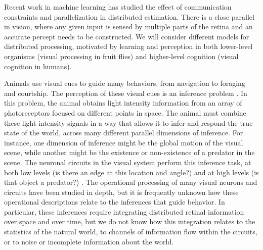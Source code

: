 
\label{sec:aim1}
\vskip-10pt


Recent work in machine learning has studied the effect of
communication constraints and parallelization in distributed
estimation. There is a close parallel in vision, where any given input
is sensed by multiple parts of the retina and an accurate percept
needs to be constructed. We will consider different models
for distributed processing, motivated by learning and perception in
both lower-level organisms (visual processing in fruit flies) and
higher-level cognition (visual cognition in humans). 


\biobackground{}
Animals use visual cues to guide many behaviors, from navigation to
foraging and courtship. The perception of these visual cues is an
inference problem \citep{knill:96}. In this problem, the
animal obtains light intensity information from an array of
photoreceptors focused on different points in space. The animal must
combine these light intensity signals in a way that allows it to infer
and respond the true state of the world, across many different
parallel dimensions of inference. For instance, one dimension of
inference might be the global motion of the visual scene, while
another might be the existence or non-existence of a predator in the
scene. The neuronal circuits in the visual system perform this
inference task, at both low levels (is there an edge at this location
and angle?) and at high levels (is that object a predator?)
\citep{simoncelli:01}. The operational processing of many
visual neurons and circuits have been studied in depth, but it is
frequently unknown how these operational descriptions relate to the
inferences that guide behavior. In particular, these inferences
require integrating distributed retinal information over space and
over time, but we do not know how this integration relates to the
statistics of the natural world, to channels of information flow
within the circuits, or to noise or incomplete information about the
world.

